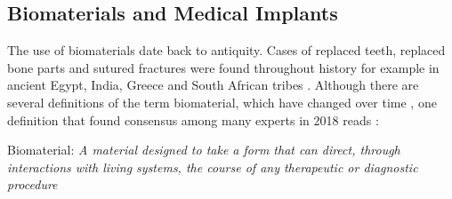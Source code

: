 \subsection{Biomaterials and Medical Implants}

The use of biomaterials date back to antiquity. Cases of replaced teeth, replaced bone parts and sutured fractures were found throughout history for example in ancient Egypt, India, Greece and South African tribes \supercite{hernigou_history_2017,al-shalawi_biodegradable_2023,balamurugan_corrosion_2008}. Although there are several definitions of the term biomaterial, which have changed over time \supercite{marin_biomaterials_2020}, one definition that found consensus among many experts in 2018 reads \supercite{ghasemi-mobarakeh_key_2019}:  \\ 
\begin{center}
  \begin{minipage}{0.9\textwidth}
    Biomaterial: 
    \textit{
      A material designed to take a form that can direct, through interactions with living systems, the course of any therapeutic or diagnostic procedure\\
    }
  \end{minipage}
\end{center}
